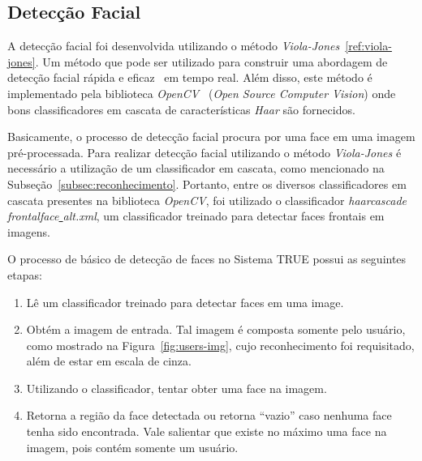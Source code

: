 	\subsection{Detecção Facial}

		A detecção facial foi desenvolvida utilizando o método \textit{Viola-Jones}~\ref{ref:viola-jones}. Um método que pode ser utilizado para construir uma abordagem de detecção facial rápida e eficaz~\cite{violajones} em tempo real. Além disso, este método é implementado pela biblioteca \textit{OpenCV}~\cite{opencv_library} (\textit{Open Source Computer Vision}) onde bons classificadores em cascata de características \textit{Haar} são fornecidos.

		Basicamente, o processo de detecção facial procura por uma face em uma imagem pré-processada. Para realizar detecção facial utilizando o método \textit{Viola-Jones} é necessário a utilização de um classificador em cascata, como mencionado na Subseção~\ref{subsec:reconhecimento}. Portanto, entre os diversos classificadores em cascata presentes na biblioteca \textit{OpenCV}, foi utilizado o classificador \textit{haarcascade\underline{ }frontalface\underline{ }alt.xml}, um classificador treinado para detectar faces frontais em imagens.


		O processo de básico de detecção de faces no Sistema TRUE possui as seguintes etapas:

		\begin{enumerate}
			\item Lê um classificador treinado para detectar faces em uma image.
			\item Obtém a imagem de entrada. Tal imagem é composta somente pelo usuário, como mostrado na Figura~\ref{fig:users-img}, cujo reconhecimento foi requisitado, além de estar em escala de cinza.
			\item Utilizando o classificador, tentar obter uma face na imagem.
			\item Retorna a região da face detectada ou retorna ``vazio'' caso nenhuma face tenha sido encontrada. Vale salientar que existe no máximo uma face na imagem, pois contém somente um usuário.
		\end{enumerate}

